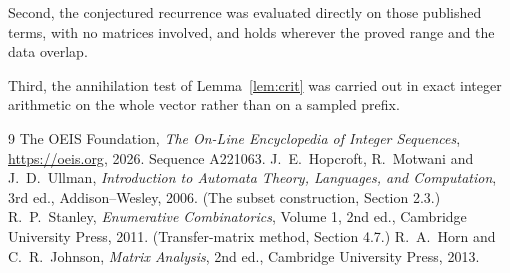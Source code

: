 \documentclass[11pt,a4paper]{article}
\theoremstyle{plain}
\theoremstyle{definition}
\begin{document}
Second, the conjectured recurrence was evaluated directly on those published terms, with no
matrices involved, and holds wherever the proved range and the data overlap.

Third, the annihilation test of Lemma~\ref{lem:crit} was carried out in exact integer
arithmetic on the whole vector rather than on a sampled prefix.

\begin{thebibliography}{9}
 The OEIS Foundation, \emph{The On-Line Encyclopedia of Integer
Sequences}, \url{https://oeis.org}, 2026. Sequence A221063.
 J.~E.~Hopcroft, R.~Motwani and J.~D.~Ullman, \emph{Introduction to Automata
Theory, Languages, and Computation}, 3rd ed., Addison--Wesley, 2006. (The subset
construction, Section 2.3.)
 R.~P.~Stanley, \emph{Enumerative Combinatorics}, Volume 1, 2nd ed.,
Cambridge University Press, 2011. (Transfer-matrix method, Section 4.7.)
 R.~A.~Horn and C.~R.~Johnson, \emph{Matrix Analysis}, 2nd ed., Cambridge
University Press, 2013.
\end{thebibliography}
\end{document}
